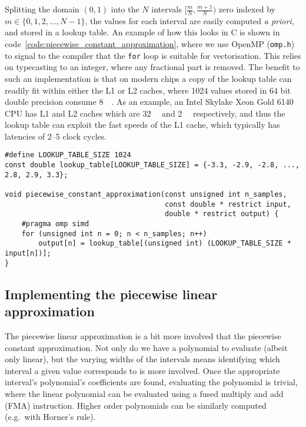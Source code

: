 \documentclass[manuscript,review]{acmart}
\begin{document}
Splitting the domain $ (0, 1) $ into the $ N $ intervals $ [\tfrac{m}{N}, \tfrac{m+1}{N}) $ zero indexed by $ m \in \{0,1,2,\ldots,N-1\}$, the values for each interval are easily computed \textit{a priori}, and stored in a lookup table. An example of how this looks in C is shown in code~\ref{code:piecewise_constant_approximation}, where we use OpenMP (\texttt{omp.h}) to signal to the compiler that the \texttt{for} loop is suitable for vectorisation. This relies on typecasting to an integer, where any fractional part is removed. The benefit to such an implementation is that on modern chips a copy of the lookup table can readily fit within either the L1 or L2 caches, where 1024 values stored in 64 bit double precision consume \SI{8}{\kilo\byte}. As an example, an Intel Skylake Xeon Gold 6140 CPU has L1 and L2 caches which are \SI{32}{\kilo\byte} and \SI{2}{\mega\byte} respectively, and thus the lookup table can exploit the fast speeds of the L1 cache, which typically has latencies of 2--5 clock cycles. 

\begin{lstfloat}[htb]
\begin{lstlisting}[style=C, caption={C implementation of the piecewise constant approximation.}, label={code:piecewise_constant_approximation}]
#define LOOKUP_TABLE_SIZE 1024
const double lookup_table[LOOKUP_TABLE_SIZE] = {-3.3, -2.9, -2.8, ..., 2.8, 2.9, 3.3};

void piecewise_constant_approximation(const unsigned int n_samples, 
                                      const double * restrict input, 
                                      double * restrict output) {
    #pragma omp simd
    for (unsigned int n = 0; n < n_samples; n++) 
        output[n] = lookup_table[(unsigned int) (LOOKUP_TABLE_SIZE * input[n])];
}
\end{lstlisting}
\end{lstfloat}

\subsection{Implementing the piecewise linear approximation}

The piecewise linear approximation is a bit more involved that the piecewise constant approximation. Not only do we have a polynomial to evaluate (albeit only linear), but the varying widths of the intervals means identifying which interval a given value corresponds to is more involved. Once the appropriate interval's polynomial's coefficients are found, evaluating the polynomial is trivial, where the linear polynomial can be evaluated using a fused multiply and add (FMA) instruction. Higher order polynomials can be similarly computed (e.g.\ with Horner's rule). 
\end{document}
